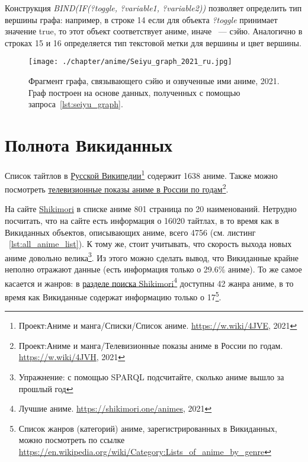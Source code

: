 Конструкция \emph{BIND(IF(?toggle, ?variable1, ?variable2))} позволяет определить тип вершины графа: например, в строке 14 если для объекта \emph{?toggle} принимает значение true, то этот объект соответствует аниме, иначе ~--- сэйю. Аналогично в строках 15 и 16 определяется тип текстовой метки для вершины и цвет вершины.

\newpage
\begin{fullwidth}
\begin{figure*}[h]
	\texttt{[image: ./chapter/anime/Seiyu\_graph\_2021\_ru.jpg]}
	\caption[Фрагмент графа, связывающего сэйю и озвученные ими аниме, 2021.]{Фрагмент графа, связывающего сэйю и озвученные ими аниме, 2021. Граф построен на основе данных, полученных с помощью запроса~\protect\ref{lst:seiyu_graph}.}%
      \label{fig:Seiyu_graph_2021_ru}%
\end{figure*} 
\end{fullwidth}

\section{Полнота Викиданных}

Список тайтлов в \href{https://w.wiki/4JVE}{Русской Википедии}\footnote{Проект:Аниме и манга/Списки/Список аниме. \href{https://w.wiki/4JVE}{https://w.wiki/4JVE}, 2021} содержит \num{1638} аниме. Также можно посмотреть \href{https://w.wiki/4JVH}{телевизионные показы аниме в России по годам}\footnote{Проект:Аниме и манга/Телевизионные показы аниме в России по годам. \href{https://w.wiki/4JVH}{https://w.wiki/4JVH}, 2021}.

На сайте \href{https://shikimori.one/}{Shikimori}\cite{shikimori} в списке аниме \num{801} страница по \num{20} наименований. Нетрудно посчитать, что на сайте есть информация о \num{16020} тайтлах, в то время как в Викиданных объектов, описывающих аниме, всего \num{4756} (см. листинг ~\protect\ref{lst:all_anime_list}). К тому же, стоит учитывать, что скорость выхода новых аниме довольно велика\footnote{Упражнение: с помощью SPARQL подсчитайте, сколько аниме вышло за прошлый год}. Из этого можно сделать вывод, что Викиданные крайне неполно отражают данные (есть информация только о \num{29.6}\% аниме). То же самое касается и жанров: в \href{https://shikimori.one/animes}{разделе поиска Shikimori}\footnote{Лучшие аниме. \href{https://shikimori.one/animes}{https://shikimori.one/animes}, 2021} доступны \num{42} жанра аниме, в то время как Викиданные содержат информацию только о \num{17}\footnote{Список жанров (категорий) аниме, зарегистрированных в Викиданных, можно посмотреть по ссылке \href{https://en.wikipedia.org/wiki/Category:Lists\_of_anime\_by\_genre}{https://en.wikipedia.org/wiki/Category:Lists\_of\_anime\_by\_genre}}.

